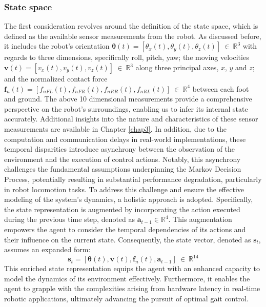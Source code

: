 \subsubsection{State space}
\label{sec:ss}
The first consideration revolves around the definition of the state space, which is defined as the available sensor measurements from the robot. As discussed before, it includes the robot's orientation $\pmb{\theta}(t) =[\theta_x(t),\theta_y(t),\theta_z(t)]\:\in\:\mathbb{R}^3$ with regards to three dimensions, specifically roll, pitch, yaw; the moving velocities $\mathbf{v}(t) =[v_x(t),v_y(t),v_z(t)]\:\in\:\mathbb{R}^3$ along three principal axes, $x$, $y$ and $z$; and the normalized contact force $\mathbf{f}_n(t)=[f_{nFL}(t), f_{nFR}(t), f_{nRR}(t), f_{nRL}(t)]\:\in\:\mathbb{R}^4$ between each foot and ground. The above 10 dimensional measurements provide a comprehensive perspective on the robot's surroundings, enabling us to infer its internal state accurately. Additional insights into the nature and characteristics of these sensor measurements are available in Chapter \ref{chap3}. In addition, due to the computation and communication delays in real-world implementations, these temporal disparities introduce asynchrony between the observation of the environment and the execution of control actions. Notably, this asynchrony challenges the fundamental assumptions underpinning the Markov Decision Process, potentially resulting in substantial performance degradation, particularly in robot locomotion tasks. To address this challenge and ensure the effective modeling of the system's dynamics, a holistic approach is adopted. Specifically, the state representation is augmented by incorporating the action executed during the previous time step, denoted as $\mathbf{a}_{t-1} \in \mathbb{R}^4$. This augmentation empowers the agent to consider the temporal dependencies of its actions and their influence on the current state. Consequently, the state vector, denoted as $\mathbf{s}_t$, assumes an expanded form: $$\mathbf{s}_t =[\pmb{\theta}(t),\mathbf{v}(t),\mathbf{f}_n(t),\mathbf{a}_{t-1}] \:\in\:\mathbb{R}^{14}$$ This enriched state representation equips the agent with an enhanced capacity to model the dynamics of its environment effectively. Furthermore, it enables the agent to grapple with the complexities arising from hardware latency in real-time robotic applications, ultimately advancing the pursuit of optimal gait control.
